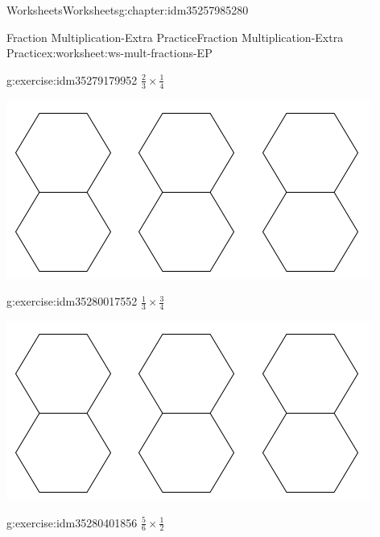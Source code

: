 \documentclass[twoside,11pt,]{book}
\begin{document}
\begin{chapterptx}{Worksheets}{}{Worksheets}{}{}{g:chapter:idm35257985280}
\begin{worksheet-section-numberless}{Fraction Multiplication-Extra Practice}{}{Fraction Multiplication-Extra Practice}{}{}{x:worksheet:ws-mult-fractions-EP}
\begin{introduction}{}
\end{introduction}%
\begin{divisionexercise}{3}{}{}{g:exercise:idm35279179952}%
\(\frac{2}{3} \times \frac{1}{4} \)%
\begin{sidebyside}{1}{0.1}{0.1}{0}%
\begin{sbspanel}{0.8}%
\includegraphics[width=1\linewidth]{images/3-double-hexagons.png}
\end{sbspanel}%
\end{sidebyside}%
\end{divisionexercise}%
\clearpage
\begin{divisionexercise}{4}{}{}{g:exercise:idm35280017552}%
\(\frac{1}{3} \times \frac{3}{4} \)%
\begin{sidebyside}{1}{0.1}{0.1}{0}%
\begin{sbspanel}{0.8}%
\includegraphics[width=1\linewidth]{images/3-double-hexagons.png}
\end{sbspanel}%
\end{sidebyside}%
\end{divisionexercise}%
\begin{divisionexercise}{5}{}{}{g:exercise:idm35280401856}%
\(\frac{5}{6} \times \frac{1}{2} \)%
\begin{sidebyside}{1}{0.1}{0.1}{0}%
\begin{sbspanel}{0.8}%

\end{sbspanel}
\end{sidebyside}
\end{divisionexercise}
\end{worksheet-section-numberless}
\end{chapterptx}
\end{document}
